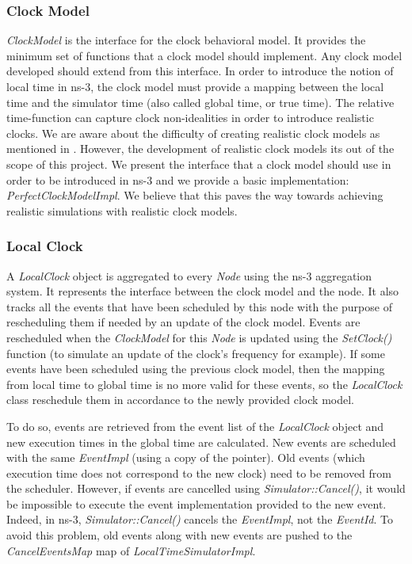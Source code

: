 \documentclass[times, twoside, watermark]{zHenriquesLab-StyleBioRxiv}
\begin{document}
\subsubsection*{Clock Model}

\textit{ClockModel} is the interface for the clock behavioral model. It provides the minimum set of functions that a clock model should implement. 
Any clock model developed should extend from this interface. In order to introduce the notion of local time in ns-3, the clock model must provide a mapping between the local time and the simulator time (also called global time, or true time). The relative time-function can capture clock non-idealities in order to introduce realistic clocks. We are aware about the difficulty of creating realistic clock models as mentioned in \cite{ClockModelDiscussion}. However, the development of realistic clock models its out of the scope of this project. We present the interface that a clock model should use in order to be introduced in ns-3 and we provide a basic implementation: \textit{PerfectClockModelImpl}.
We believe that this paves the way towards achieving realistic simulations with realistic clock models. 

\subsubsection*{Local Clock}
A \textit{LocalClock} object is aggregated to every \textit{Node} using the ns-3 aggregation system. It represents the interface between the clock model and the node. 
It also tracks all the events that have been scheduled by this node with the purpose of rescheduling them if needed by an update of the clock model. Events are rescheduled when 
the \textit{ClockModel} for this \textit{Node} is updated using the \textit{SetClock()} function (to simulate an update of the clock's frequency for example). If some events have been scheduled using the previous clock model, then the mapping from local time to global time is no more valid for these events, so the \textit{LocalClock} class reschedule them in accordance to the newly provided clock model.

To do so, events are retrieved from the event list of the \textit{LocalClock} object and new execution times in the global time are calculated. New events are scheduled with the same \textit{EventImpl} (using a copy of the pointer).
Old events (which execution time does not correspond to the new clock) need to be removed from the scheduler. However, if events are cancelled using
\textit{Simulator::Cancel()}, it would be impossible to execute the event implementation provided to the new event. Indeed, in ns-3, \textit{Simulator::Cancel()} cancels the \textit{EventImpl}, not the \textit{EventId}. To avoid this problem, old events along with new events are pushed to the \textit{CancelEventsMap} map of \textit{LocalTimeSimulatorImpl}. 
\end{document}
